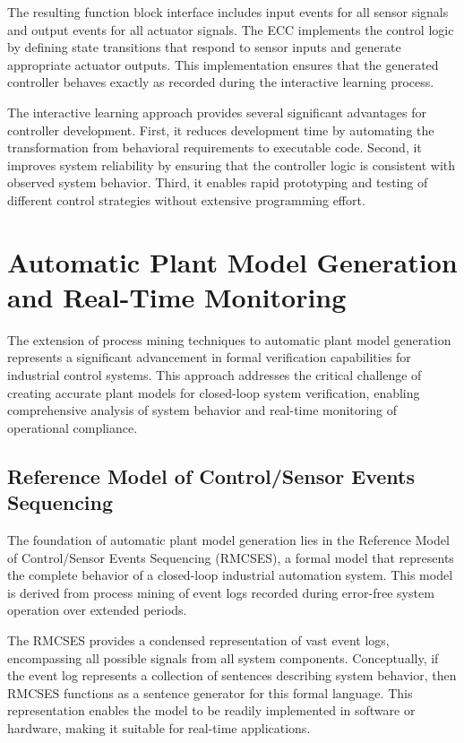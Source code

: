 The resulting function block interface includes input events for all sensor signals and output events for all actuator signals. The ECC implements the control logic by defining state transitions that respond to sensor inputs and generate appropriate actuator outputs. This implementation ensures that the generated controller behaves exactly as recorded during the interactive learning process.


The interactive learning approach provides several significant advantages for controller development. First, it reduces development time by automating the transformation from behavioral requirements to executable code. Second, it improves system reliability by ensuring that the controller logic is consistent with observed system behavior. Third, it enables rapid prototyping and testing of different control strategies without extensive programming effort.

\section{Automatic Plant Model Generation and Real-Time Monitoring}

The extension of process mining techniques to automatic plant model generation represents a significant advancement in formal verification capabilities for industrial control systems. This approach addresses the critical challenge of creating accurate plant models for closed-loop system verification, enabling comprehensive analysis of system behavior and real-time monitoring of operational compliance.

\subsection{Reference Model of Control/Sensor Events Sequencing}

The foundation of automatic plant model generation lies in the Reference Model of Control/Sensor Events Sequencing (RMCSES), a formal model that represents the complete behavior of a closed-loop industrial automation system. This model is derived from process mining of event logs recorded during error-free system operation over extended periods.

The RMCSES provides a condensed representation of vast event logs, encompassing all possible signals from all system components. Conceptually, if the event log represents a collection of sentences describing system behavior, then RMCSES functions as a sentence generator for this formal language. This representation enables the model to be readily implemented in software or hardware, making it suitable for real-time applications.

